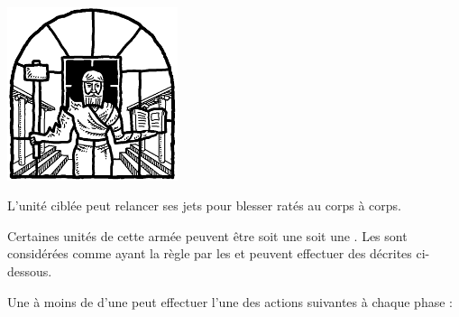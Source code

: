 \begin{multicols}{3}
\vspace*{\fill}
\columnbreak
	
\begin{center}
	\includegraphics[width=5cm]{pics/volundsblessing.png}
	
	\vspace*{5pt}{\Largerfontsize\antiquefont\volundsblessing{}}
	
	\vspace*{5pt}L'unité ciblée peut relancer ses jets pour blesser ratés au corps à corps.
\end{center}

\vspace*{\fill}
\end{multicols}


Certaines unités de cette armée peuvent être soit une \parentunit{} soit une \supportunit{}. Les \supportunits{} sont considérées comme ayant la règle \insignificant{} par les \parentunits{} et peuvent effectuer des \supportingactions{} décrites ci-dessous. 

\armyspecialruleentry{\supportingactions}

Une \supportunit{} à moins de  d'une \parentunit{} peut effectuer l'une des actions suivantes à chaque phase :

